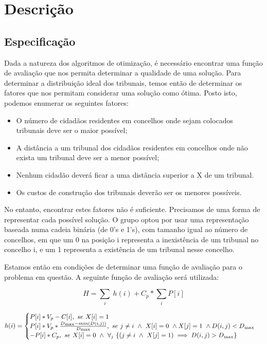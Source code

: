 \documentclass[11pt,a4paper,reqno]{article}
\numberwithin{equation}{section}
\begin{document}

\newpage

\section{Descrição} 
\subsection{Especificação} \label{introduction}

Dada a natureza dos algoritmos de otimização, é necessário encontrar uma função de avaliação que nos permita determinar a qualidade de uma solução. Para determinar a distribuição ideal dos tribunais, temos então de determinar os fatores que nos permitam considerar uma solução como ótima. Posto isto, podemos enumerar os seguintes fatores:

\begin{itemize}
\item O número de cidadãos residentes em concelhos onde sejam colocados tribunais deve ser o maior possível;
\item A distância a um tribunal dos cidadãos residentes em concelhos onde não exista um tribunal deve ser a menor possível;
\item Nenhum cidadão deverá ficar a uma distância superior a X de um tribunal.
\item Os custos de construção dos tribunais deverão ser os menores possíveis.
\end{itemize}

No entanto, encontrar estes fatores não é suficiente. Precisamos de uma forma de representar cada possível solução. O grupo optou por usar uma representação baseada numa cadeia binária (de 0's e 1's), com tamanho igual ao número de concelhos, em que um 0 na posição i representa a inexistência de um tribunal no concelho i, e um 1 representa a existência de um tribunal nesse concelho.

Estamos então em condições de determinar uma função de avaliação para o problema em questão. A seguinte função de avaliação será utilizada:

\begin{equation}
    H = \sum\limits_{i}\ h(i) + C_p * \sum\limits_{i} P[i]
\end{equation}

\begin{equation}    
h(i) = \begin{cases} 
    P[i] * V_p - C[i] ,\  se \  X[i] = 1 \\
    P[i] * V_p * \frac{D\textsubscript{max} - min(D(i, j))}{D\textsubscript{max}}, \ se \ j \neq i \  \wedge \ X[i] = 0 \ \wedge X[j] = 1 \  \wedge D(i, j) < D\textsubscript{max} \\
    -P[i] * C_p,\  se \ X[i] = 0 \ \wedge \ \forall _j \ \{(j \neq i \ \wedge \  X[j] = 1) \implies D(i, j) > D\textsubscript{max}\} \\
	\end{cases}\\
\end{equation}
	
\end{document}
